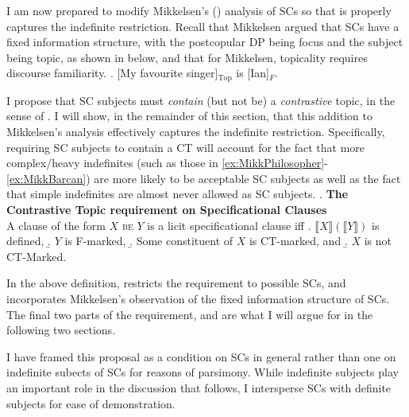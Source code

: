 \documentclass[GPFinal]{subfiles}
\begin{document}
I am now prepared to modify Mikkelsen's (\citeyear{mikkelsen2004specifying}) analysis of SCs so that is properly captures the indefinite restriction.
Recall that Mikkelsen argued that SCs have a fixed information structure, with the postcopular DP being focus and the subject being topic, as shown in \Next below, and that for Mikkelsen, topicality requires discourse familiarity.
\ex. [My favourite singer]$_\text{Top}$ is [Ian]$_F$.

I propose that SC subjects must \textit{contain} (but not be) a \textit{contrastive} topic, in the sense of \textcite{buring2003d,buringforthcomingtopic}.
I will show, in the remainder of this section, that this addition to Mikkelsen's analysis effectively captures the indefinite restriction.
Specifically, requiring SC subjects to contain a CT will account for the fact that more complex/heavy indefinites (such as those in \ref{ex:MikkPhilosopher}-\ref{ex:MikkBarcan}) are more likely to be acceptable SC subjects as well as the fact that simple indefinites are almost never allowed as SC subjects.
\ex. \textbf{The Contrastive Topic requirement on Specificational Clauses}\\
A clause of the form $X$ \textsc{be} $Y$ is a licit specificational clause iff
\a. $\llbracket X\rrbracket(\llbracket Y\rrbracket)$ is defined,
\b. $Y$ is F-marked, \parencite{mikkelsen2004specifying}
\b. Some constituent of $X$ is CT-marked, and
\b. $X$ is not CT-Marked.

In the above definition, \Last[a] restricts the requirement to possible SCs, and \Last[b] incorporates Mikkelsen's observation of the fixed information structure of SCs.
The final two parts of the requirement, \Last[c] and \Last[d] are what I will argue for in the following two sections.

I have framed this proposal as a condition on SCs in general rather than one on indefinite subects of SCs for reasons of parsimony.
While indefinite subjects play an important role in the discussion that follows, I intersperse SCs with definite subjects for ease of demonstration.


\end{document}
